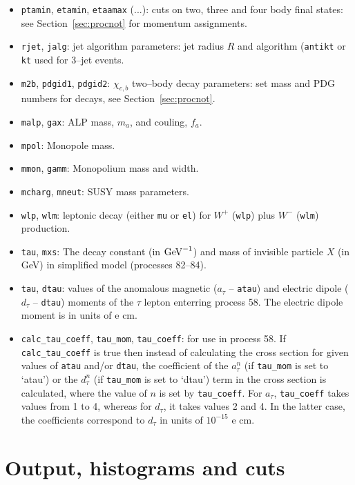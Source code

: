 \documentclass[12pt]{article}
\begin{document}
\begin{itemize}
\item \texttt{ptamin}, \texttt{etamin}, \texttt{etaamax} (...): cuts on two, three and four body final states: see 
Section~\ref{sec:procnot} for momentum assignments.
\item \texttt{rjet}, \texttt{jalg}: jet algorithm parameters: jet radius $R$ and algorithm (\texttt{antikt} or \texttt{kt}  
used for 3--jet events.
\item \texttt{m2b}, \texttt{pdgid1}, \texttt{pdgid2}: $\chi_{c,b}$ two--body decay parameters: set mass and PDG numbers for 
decays, see Section~\ref{sec:procnot}.
\item \texttt{malp}, \texttt{gax}: ALP mass, $m_a$, and couling, $f_a$.
\item \texttt{mpol}: Monopole mass.
\item \texttt{mmon}, \texttt{gamm}: Monopolium mass and width.
\item \texttt{mcharg}, \texttt{mneut}: SUSY mass parameters.
\item \texttt{wlp}, \texttt{wlm}: leptonic decay (either \texttt{mu} or \texttt{el}) for $W^+$ (\texttt{wlp}) plus 
$W^-$ (\texttt{wlm}) production.
\item \texttt{tau}, \texttt{mxs}: The decay constant (in ${\rm GeV}^{-1}$) and mass of invisible particle $X$ (in GeV) 
in simplified model (processes 82--84).
\item \texttt{tau}, \texttt{dtau}: values of the anomalous magnetic ($a_\tau$ -- \texttt{atau}) and electric dipole ($d_\tau$ -- \texttt{dtau}) moments of the $\tau$ lepton enterring process 58. The electric dipole moment is in units of e cm.
\item \texttt{calc\_tau\_coeff}, \texttt{tau\_mom}, \texttt{tau\_coeff}: for use in process 58. If  \texttt{calc\_tau\_coeff} is true then instead of calculating the cross section for given values of \texttt{atau} and/or \texttt{dtau}, the coefficient of the $a_\tau^n$ (if \texttt{tau\_mom} is set to `atau') or  the $d_\tau^n$ (if \texttt{tau\_mom} is set to `dtau') term in the cross section is calculated, where the value of $n$ is set by  \texttt{tau\_coeff}. For $a_\tau$,  \texttt{tau\_coeff} takes values from 1 to 4, whereas for $d_\tau$, it takes values 2 and 4. In the latter case, the coefficients correspond to $d_\tau$ in units of $10^{-15}$ e cm.

\end{itemize}

\section{Output, histograms and cuts}\label{sec:hist}
\end{document}
